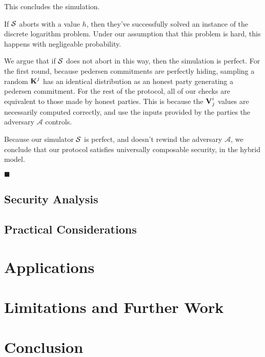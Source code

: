 This concludes the simulation.

If $\mathcal{S}$ aborts with a value $h$, then they've successfully
solved an instance of the discrete logarithm problem. Under our
assumption that this problem is hard, this happens with negligeable
probability.

We argue that if $\mathcal{S}$ does not abort in this way, then the simulation
is perfect. For the first round, because pedersen commitments
are perfectly hiding, sampling a random $\textbf{K}^j$ has an identical
distribution as an honest party generating a pedersen commitment.
For the rest of the protocol, all of our checks are equivalent
to those made by honest parties. This is because the
$\textbf{V}^i_j$ values are necessarily computed correctly, and use
the inputs provided by the parties the adversary $\mathcal{A}$ controls.

Because our simulator $\mathcal{S}$ is perfect, and doesn't
rewind the adversary $\mathcal{A}$, we conclude that our protocol
satisfies universally composable security, in the hybrid model.

$\blacksquare$

\subsection{Security Analysis}

\subsection{Practical Considerations}

\section{Applications}

\section{Limitations and Further Work}

\section{Conclusion}


\small 

